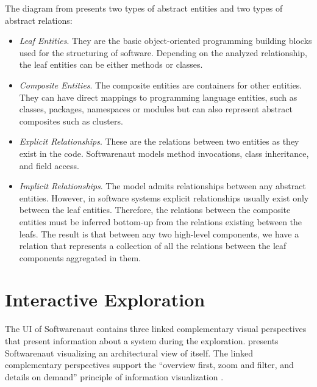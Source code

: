 \documentclass[preprint,12pt]{elsarticle}
\begin{document}
The diagram from  presents two types of abstract entities and two types of abstract relations:

\begin{itemize}

\item {\em Leaf Entities}. They are the basic object-oriented programming building blocks used for the structuring of software. Depending on the analyzed relationship, the leaf entities can be either methods or classes.

\item {\em Composite Entities}. The composite entities are containers for other entities. They can have direct mappings to programming language entities, such as classes, packages, namespaces or modules but can also represent abstract composites such as clusters.

\item {\em Explicit Relationships}. These are the relations between two entities as they exist in the code. Softwarenaut models method invocations, class inheritance, and field access.

\item {\em Implicit Relationships}. The model admits relationships between any abstract entities. However, in software systems explicit relationships usually exist only between the leaf entities. Therefore, the relations between the composite entities must be inferred bottom-up from the relations existing between the leafs. The result is that between any two high-level components, we have a relation that represents a collection of all the relations between the leaf components aggregated in them.

\end{itemize}


\newpage
\section {Interactive Exploration} \label {sec:interact}
The UI of Softwarenaut contains three linked complementary visual perspectives that present information about a system during the exploration.  presents Softwarenaut visualizing an architectural view of itself. The linked complementary perspectives support the ``overview first, zoom and filter, and details on demand'' principle of information visualization \cite{shneid-eyes}. 
\end{document}
